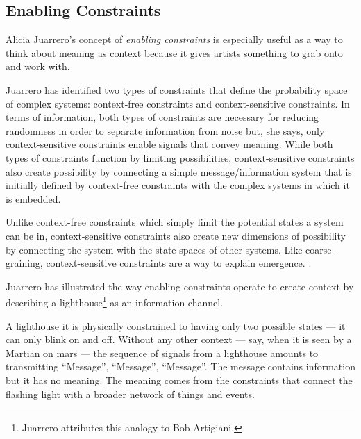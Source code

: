 \documentclass[letterpaper]{article}
\begin{document}
    \subsection{Enabling Constraints}

    Alicia Juarrero's concept of \emph{enabling constraints} is especially useful as a way to think about meaning as context because it gives artists something to grab onto and work with.
    
    Juarrero has identified two types of constraints that define the probability space of complex systems: context-free constraints and context-sensitive constraints. In terms of information, both types of constraints are necessary for reducing randomness in order to separate information from noise but, she says, only context-sensitive constraints enable signals that convey meaning. While both types of constraints function by limiting possibilities, context-sensitive constraints also create possibility by connecting a simple message/information system that is initially defined by context-free constraints with the complex systems in which it is embedded.
    
    Unlike context-free constraints which simply limit the potential states a system can be in, context-sensitive constraints also create new dimensions of possibility by connecting the system with the state-spaces of other systems. Like coarse-graining, context-sensitive constraints are a way to explain emergence. \citep[p.240]{JuarreroCsltyAsCnstrnt1998}.

    Juarrero has illustrated the way enabling constraints operate to create context by describing a lighthouse\footnote{

        Juarrero attributes this analogy to Bob Artigiani.

    } as an information channel.
    
    A lighthouse it is physically constrained to having only two possible states — it can only blink on and off. Without any other context — say, when it is seen by a Martian on mars — the sequence of signals from a lighthouse amounts to transmitting “Message”, “Message”, “Message”. The message contains information but it has no meaning. The meaning comes from the constraints that connect the flashing light with a broader network of things and events.
\end{document}
